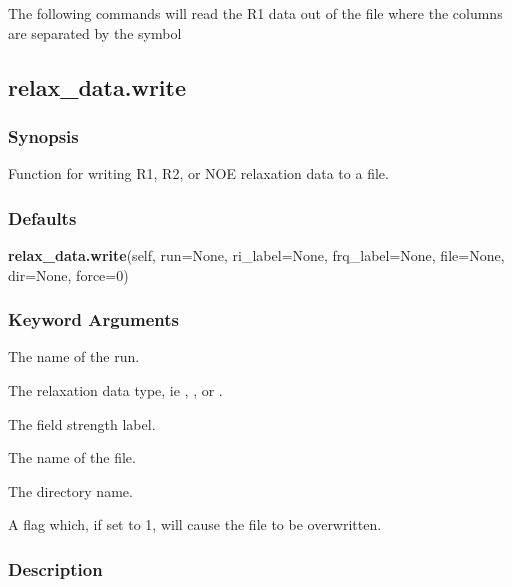 



The following commands will read the R1 data out of the file 
 where the columns are
separated by the symbol 





\newpage

\subsection{relax\_data.write}


\subsubsection{Synopsis}

Function for writing R1, R2, or NOE relaxation data to a file.

\subsubsection{Defaults}

\textsf{\textbf{relax\_data.write}(self, run=None, ri\_label=None, frq\_label=None, file=None, dir=None, force=0)}


\subsubsection{Keyword Arguments}


  The name of the run.

  The relaxation data type, ie 
, 
, or 
.

  The field strength label.

  The name of the file.

  The directory name.

  A flag which, if set to 1, will cause the file to be overwritten.

\subsubsection{Description}

